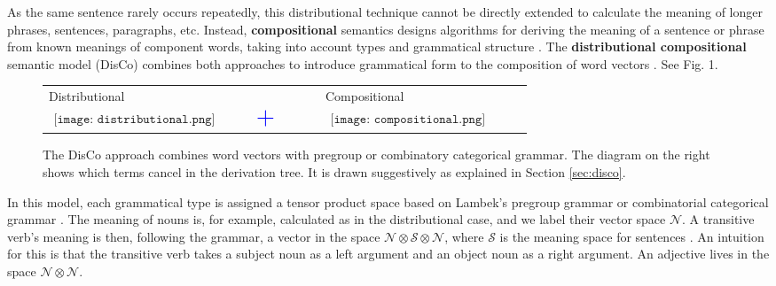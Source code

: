 As the same sentence rarely occurs repeatedly, this distributional technique cannot be directly extended to calculate the meaning of longer phrases, sentences, paragraphs, etc. Instead, \textbf{compositional} semantics designs algorithms for deriving the meaning of a sentence or phrase from known meanings of component words,  taking into account types and grammatical structure \cite{lambek2008word}. The \textbf{distributional compositional} semantic model (DisCo) combines both approaches to introduce grammatical form to the composition of word vectors \cite{clark2008compositional}. See Fig. 1. 

\begin{figure}[ht]
\label{fig:discofig}
\begin{center}
\begin{tabular}{m{0.3\linewidth}@{}m{0.1\linewidth}@{}m{0.3\linewidth}}
 Distributional & & Compositional \\
 $\begin{aligned}
 \texttt{[image: distributional.png]}
 \end{aligned}$
 & $\begin{aligned}\mbox{{\color{blue} \huge +}}\end{aligned}$ & 
  $\begin{aligned}
 \texttt{[image: compositional.png]}
 \end{aligned}$
\end{tabular}
\end{center}
\caption{The DisCo approach combines word vectors with pregroup or combinatory categorical grammar. The diagram on the right shows which terms cancel in the derivation tree.  It is drawn suggestively as explained in Section \ref{sec:disco}. }
\end{figure}

In this model, each grammatical type is assigned a tensor product space based on Lambek's pregroup grammar \cite{lambek2008word} or combinatorial categorical grammar \cite{hermann2013role}. The meaning of nouns is, for example, calculated as in the distributional case, and we label their vector space $\mathcal{N}$.  A transitive verb's meaning is then, following the grammar, a vector in the space $\mathcal{N}\otimes \mathcal{S} \otimes \mathcal{N}$, where $\mathcal{S}$ is the meaning space for sentences \cite{clark2008compositional}. An intuition for this is that the transitive verb takes a subject noun as a left argument and an object noun as a right argument. An adjective lives in the space $\mathcal{N}\otimes\mathcal{N}$.

